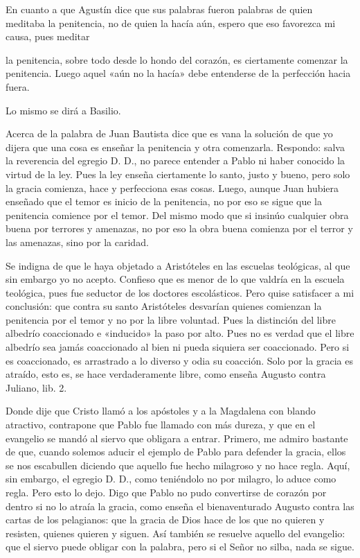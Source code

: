 En cuanto a que Agustín dice que sus palabras fueron palabras de quien meditaba la penitencia, no de quien la hacía aún, espero que eso favorezca mi causa, pues meditar

la penitencia, sobre todo desde lo hondo del corazón, es ciertamente comenzar la penitencia. Luego aquel «aún no la hacía» debe entenderse de la perfección hacia fuera.

Lo mismo se dirá a Basilio.

Acerca de la palabra de Juan Bautista dice que es vana la solución de que yo dijera que una cosa es enseñar la penitencia y otra comenzarla. Respondo: salva \marginpar{\small[370]} la reverencia del egregio D. D., no parece entender a Pablo ni haber conocido la virtud de la ley. Pues la ley enseña ciertamente lo santo, justo y bueno, pero solo la gracia comienza, hace y perfecciona esas cosas. Luego, aunque Juan hubiera enseñado que el temor es inicio de la penitencia, no por eso se sigue que la penitencia comience por el temor. Del mismo modo que si insinúo cualquier obra buena por terrores y amenazas, no por eso la obra buena comienza por el terror y las amenazas, sino por la caridad.

Se indigna de que le haya objetado a Aristóteles en las escuelas teológicas, al que sin embargo yo no acepto. Confieso que es menor de lo que valdría en la escuela teológica, pues fue seductor de los doctores escolásticos. Pero quise satisfacer a mi conclusión: que contra su santo Aristóteles desvarían quienes comienzan la penitencia por el temor y no por la libre voluntad. Pues la distinción del libre albedrío coaccionado e «inducido» la paso por alto. Pues no es verdad que el libre albedrío sea jamás coaccionado al bien ni pueda siquiera ser coaccionado. Pero si es coaccionado, es arrastrado a lo diverso y odia su coacción. Solo por la gracia es atraído, esto es, se hace verdaderamente libre, como enseña Augusto contra Juliano, lib. 2.

Donde dije que Cristo llamó a los apóstoles y a la Magdalena con blando atractivo, contrapone que Pablo fue llamado con más dureza, y que en el evangelio se mandó al siervo que obligara a entrar. Primero, me admiro bastante de que, cuando solemos aducir el ejemplo de Pablo para defender la gracia, ellos se nos escabullen diciendo que aquello fue hecho milagroso y no hace regla. Aquí, sin embargo, el egregio D. D., como teniéndolo no por milagro, lo aduce como regla. Pero esto lo dejo. Digo que Pablo no pudo convertirse de corazón por dentro si no lo atraía la gracia, como enseña el bienaventurado Augusto contra las cartas de los pelagianos: que la gracia de Dios hace de los que no quieren y resisten, quienes quieren y siguen. Así también se resuelve aquello del evangelio: que el siervo puede obligar con la palabra, pero si el Señor no silba, nada se sigue.

